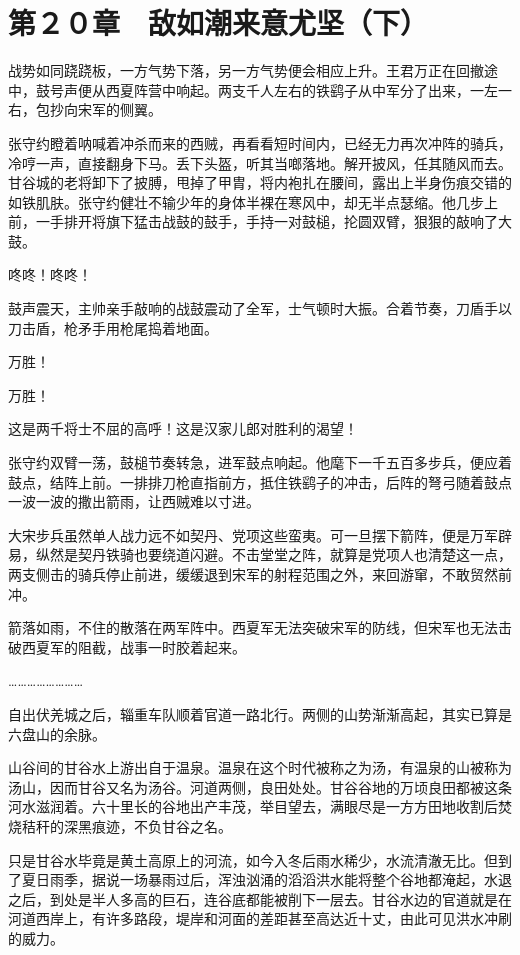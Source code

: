 \section{第２０章　敌如潮来意尤坚（下）}

战势如同跷跷板，一方气势下落，另一方气势便会相应上升。王君万正在回撤途中，鼓号声便从西夏阵营中响起。两支千人左右的铁鹞子从中军分了出来，一左一右，包抄向宋军的侧翼。

张守约瞪着呐喊着冲杀而来的西贼，再看看短时间内，已经无力再次冲阵的骑兵，冷哼一声，直接翻身下马。丢下头盔，听其当啷落地。解开披风，任其随风而去。甘谷城的老将卸下了披膊，甩掉了甲胄，将内袍扎在腰间，露出上半身伤痕交错的如铁肌肤。张守约健壮不输少年的身体半裸在寒风中，却无半点瑟缩。他几步上前，一手排开将旗下猛击战鼓的鼓手，手持一对鼓槌，抡圆双臂，狠狠的敲响了大鼓。

咚咚！咚咚！

鼓声震天，主帅亲手敲响的战鼓震动了全军，士气顿时大振。合着节奏，刀盾手以刀击盾，枪矛手用枪尾捣着地面。

万胜！

万胜！

这是两千将士不屈的高呼！这是汉家儿郎对胜利的渴望！

张守约双臂一荡，鼓槌节奏转急，进军鼓点响起。他麾下一千五百多步兵，便应着鼓点，结阵上前。一排排刀枪直指前方，抵住铁鹞子的冲击，后阵的弩弓随着鼓点一波一波的撒出箭雨，让西贼难以寸进。

大宋步兵虽然单人战力远不如契丹、党项这些蛮夷。可一旦摆下箭阵，便是万军辟易，纵然是契丹铁骑也要绕道闪避。不击堂堂之阵，就算是党项人也清楚这一点，两支侧击的骑兵停止前进，缓缓退到宋军的射程范围之外，来回游窜，不敢贸然前冲。

箭落如雨，不住的散落在两军阵中。西夏军无法突破宋军的防线，但宋军也无法击破西夏军的阻截，战事一时胶着起来。

……………………

自出伏羌城之后，辎重车队顺着官道一路北行。两侧的山势渐渐高起，其实已算是六盘山的余脉。

山谷间的甘谷水上游出自于温泉。温泉在这个时代被称之为汤，有温泉的山被称为汤山，因而甘谷又名为汤谷。河道两侧，良田处处。甘谷谷地的万顷良田都被这条河水滋润着。六十里长的谷地出产丰茂，举目望去，满眼尽是一方方田地收割后焚烧秸秆的深黑痕迹，不负甘谷之名。

只是甘谷水毕竟是黄土高原上的河流，如今入冬后雨水稀少，水流清澈无比。但到了夏日雨季，据说一场暴雨过后，浑浊汹涌的滔滔洪水能将整个谷地都淹起，水退之后，到处是半人多高的巨石，连谷底都能被削下一层去。甘谷水边的官道就是在河道西岸上，有许多路段，堤岸和河面的差距甚至高达近十丈，由此可见洪水冲刷的威力。

